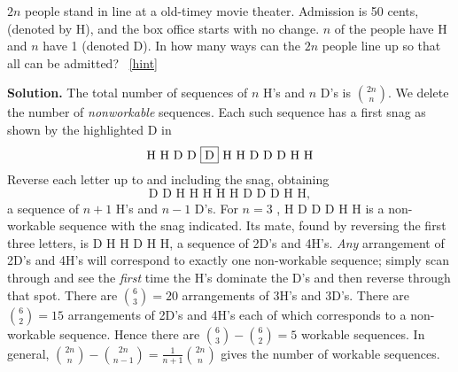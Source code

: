 \documentclass{book}
\begin{document}
\setcounter{project}{173}
\addtocounter{project}{-1}
\begin{activity}[]\label{act-hdseq}
\hypertarget{p-1045}{}%
\(2n\) people stand in line at a old-timey movie theater. Admission is 50 cents, (denoted by H), and the box office starts with no change. \(n\) of the people have H and \(n\) have \textdollar{}1 (denoted D). In how many ways can the \(2n\) people line up so that all can be admitted?%
~\hfill{\tiny\hyperlink{a-173}{[hint]}\hypertarget{q-173}{}}\par\smallskip%
\noindent\textbf{Solution.}\hypertarget{solution-109}{}\quad%
\hypertarget{p-1047}{}%
The total number of sequences of \(n\) H's and \(n\) D's is \(\binom{2n}{n}\). We delete the number of \emph{nonworkable} sequences. Each such sequence has a first snag as shown by the highlighted D in%
\begin{equation*}
\text{H\ H\ D\ D\ \alert{D}\ H\ H\ D\ D\ D\ H\ H}
\end{equation*}
Reverse each letter up to and including the snag, obtaining%
\begin{equation*}
\text{D D H H H H H D D D H H},
\end{equation*}
a sequence of \(n+1\) H's and \(n-1\) D's. For \(n = 3\) , H D \alert{D} D H H is a non-workable sequence with the snag indicated. Its mate, found by reversing the first three letters, is D H H D H H, a sequence of 2D's and 4H's. \emph{Any} arrangement of 2D's and 4H's will correspond to exactly one non-workable sequence; simply scan through and see the \emph{first} time the H's dominate the D's and then reverse through that spot. There are \(\binom{6}{3}
= 20\) arrangements of 3H's and 3D's. There are \(\binom{6}{2}
= 15\) arrangements of 2D's and 4H's each of which corresponds to a non-workable sequence. Hence there are \(\binom{6}{3}
-\binom{6}{2} = 5\) workable sequences. In general, \(\binom{2n}{n}  - \binom{2n}{n - 1} = \frac{1}{n + 1}\binom{2n}{n}\) gives the number of workable sequences.%
\end{activity}
\end{document}

